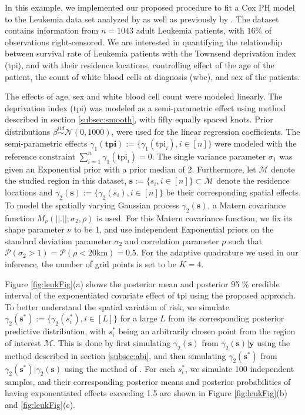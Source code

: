 \documentclass[ba]{imsart}
\begin{document}
In this example, we implemented our proposed procedure to fit a Cox PH model to the Leukemia data set analyzed by \cite{inlacoxph} as well as previously by \cite{spde,leukaemia}. The dataset contains information from $n=1043$ adult Leukemia patients, with $16\%$ of observations right-censored. We are interested in quantifying the relationship between survival rate of Leukemia patients with the Townsend deprivation index (tpi), and with their residence locations, controlling effect of the age of the patient, the count of white blood cells at diagnosis (wbc), and sex of the patients.

The effects of age, sex and white blood cell count were modeled linearly. The deprivation index (tpi) was modeled as a semi-parametric effect using method described in section \ref{subsec:smooth}, with fifty equally spaced knots. Prior distributions $\beta \stackrel{iid}{\sim} \mathcal{N}(0, 1000)$, were used for the linear regression coefficients. The semi-parametric effects $\gamma_1(\textbf{tpi}) := \{\gamma_1(\text{tpi}_i), i\in [n]\}$ were modeled with the reference constraint $\sum_{i=1}^{n}\gamma_1(\text{tpi}_i) = 0$. The single variance parameter $\sigma_1$ was given an $\text{Exponential}$ prior with a prior median of 2. Furthermore, let $\mathcal{M}$ denote the studied region in this dataset, $\boldsymbol{s} := \{s_i, i \in [n]\} \subset \mathcal{M}$ denote the residence locations and $\gamma_2(\boldsymbol{s}) := \{\gamma_2(s_i), i \in [n]\}$ be their corresponding spatial effects. To model the spatially varying Gaussian process $\gamma_2(\boldsymbol{s})$, a Matern covariance function $M_\nu(||.||;\sigma_2,\rho)$ is used. For this Matern covariance function, we fix its shape parameter $\nu$ to be 1, and use independent Exponential priors on the standard deviation parameter $\sigma_2$ and correlation parameter $\rho$ such that $\mathcal{P}(\sigma_2 > 1) = \mathcal{P}(\rho < 20 \text{km}) = 0.5$.
For the adaptive quadrature we used in our inference, the number of grid points is set to be $K = 4$. 

Figure \ref{fig:leukFig}(a) shows the posterior mean and posterior 95 \% credible interval of the exponentiated covariate effect of tpi using the proposed approach. To better understand the spatial variation of risk, we simulate $\gamma_2(\boldsymbol{s^*}):= \{\gamma_2(s_i^*), i\in [L]\}$ for a large $L$ from its corresponding posterior predictive distribution, with $s_i^*$ being an arbitrarily chosen point from the region of interest $\mathcal{M}$. This is done by first simulating $\gamma_2(\boldsymbol{s})$ from $\gamma_2(\boldsymbol{s})|\boldsymbol{y}$ using the method described in section \ref{subsec:abi}, and then simulating $\gamma_2(\boldsymbol{s}^*)$ from $\gamma_2(\boldsymbol{s}^*)|\gamma_2(\boldsymbol{s})$ using the method of \cite{schlather2015analysis}. For each $s_i^*$, we simulate 100 independent samples, and their corresponding posterior means and posterior probabilities of having exponentiated effects exceeding 1.5 are shown in Figure \ref{fig:leukFig}(b) and \ref{fig:leukFig}(c).
\end{document}
